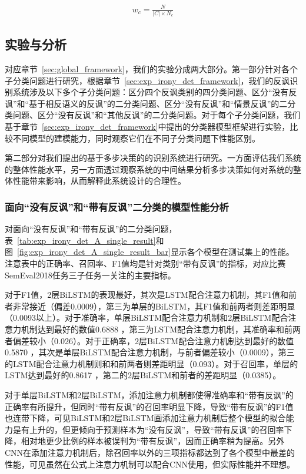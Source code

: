 \begin{align}
    \label{eq:class_weight}
    w_c = \frac{N}{|C| \times N_c}
\end{align}

\subsection{实验与分析}

对应章节~\ref{sec:global_framework}，我们的实验分成两大部分。第一部分针对各个子分类问题进行研究，根据章节~\ref{sec:exp_irony_det_framework}，我们的反讽识别系统涉及以下多个子分类问题：区分四个反讽类别的四分类问题、区分“没有反讽”和“基于相反语义的反讽”的二分类问题、区分“没有反讽”和“情景反讽”的二分类问题、区分“没有反讽”和“其他反讽”的二分类问题。对于每个子分类问题，我们基于章节~\ref{sec:exp_irony_det_framework}中提出的分类器模型框架进行实验，比较不同模型的建模能力，同时观察它们在不同子分类问题下性能区别。

第二部分对我们提出的基于多步决策的的识别系统进行研究。一方面评估我们系统的整体性能水平，另一方面透过观察系统的中间结果分析多步决策如何对系统的整体性能带来影响，从而解释此系统设计的合理性。

\subsubsection{面向“没有反讽”和“带有反讽”二分类的模型性能分析}
\label{sssec:exp_irony_det_A_base}

对面向“没有反讽”和“带有反讽”的二分类问题，表~\ref{tab:exp_irony_det_A_single_result}和图~\ref{fig:exp_irony_det_A_single_result_bar}显示各个模型在测试集上的性能。注意表中的正确率、召回率、F1值均是针对类别“带有反讽”的指标，对应比赛SemEval2018任务三子任务一关注的主要指标。

对于F1值，2层BiLSTM的表现最好，其次是LSTM配合注意力机制，其F1值和前者非常接近（偏差0.0009），第三为单层的BiLSTM，其F1值和前两者则差距明显（0.0093以上）。对于准确率，单层BiLSTM配合注意力机制和2层BiLSTM配合注意力机制达到最好的数值0.6888 ，第三为LSTM配合注意力机制，其准确率和前两者偏差较小（0.026）。对于正确率，2层BiLSTM配合注意力机制达到最好的数值0.5870 ，其次是单层BiLSTM配合注意力机制，与前者偏差较小（0.0009），第三的LSTM配合注意力机制则和和前两者则差距明显（0.093）。对于召回率，单层的LSTM达到最好的0.8617 ，第二的2层BiLSTM和前者的差距明显（0.0385）。

对于单层BiLSTM和2层BiLSTM，添加注意力机制都使得准确率和“带有反讽”的正确率有所提升，但同时“带有反讽”的召回率明显下降，导致“带有反讽”的F1值也连带下降，可见BiLSTM和2层BiLSTM画添加注意力机制后整个模型的拟合能力是有上升的，但更倾向于预测样本为“没有反讽”，导致“带有反讽”的召回率下降，相对地更少比例的样本被误判为“带有反讽”，因而正确率稍为提高。另外CNN在添加注意力机制后，除召回率以外的三项指标都达到了各个模型中最差的性能，可见虽然在公式上注意力机制可以配合CNN使用，但实际性能并不理想。

